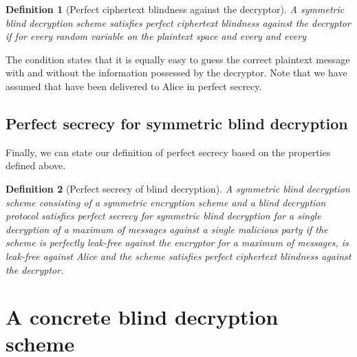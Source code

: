 \documentclass[10pt,journal]{IEEEtran}
\newtheorem{definition}{Definition}[section]
\begin{document}
\begin{definition}[Perfect ciphertext blindness against the decryptor]
\label{def:Perfect ciphertext blindness against decryptor}
A symmetric blind decryption
scheme
satisfies \emph{perfect ciphertext blindness against the decryptor}
if for every random variable  on the plaintext space
and every  and every 

\end{definition}
The condition states that it is equally easy to guess the correct plaintext message with
and without the information possessed by the decryptor. Note that we have
assumed that  have been delivered to Alice in perfect secrecy.



\subsection{Perfect secrecy for symmetric blind decryption}

Finally, we can state our definition of perfect secrecy based on the properties defined above.
\begin{definition}[Perfect secrecy of blind decryption]
\label{def:Perfect secrecy of blind decryption}
A symmetric blind decryption
scheme consisting of a symmetric encryption scheme  and a blind decryption protocol 
satisfies perfect secrecy for symmetric blind decryption
for a single decryption of a maximum of  messages
against a single malicious party
if the scheme is perfectly leak-free against the encryptor for a maximum of  messages,
 is leak-free against Alice 
and the scheme satisfies perfect ciphertext blindness against the decryptor.
\end{definition}

\section{A concrete blind decryption scheme}
\label{sec:Perfectly secure encryption}
\end{document}
